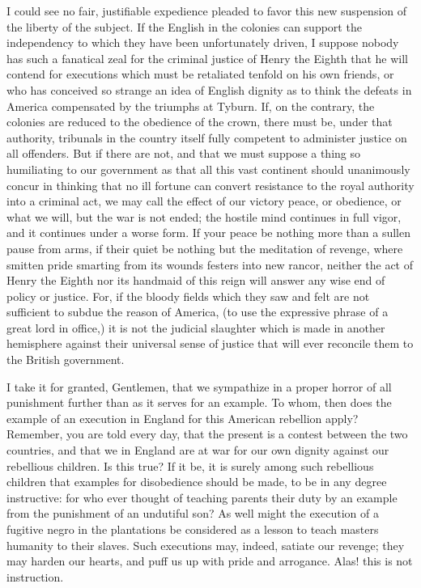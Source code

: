 I could see no fair, justifiable expedience pleaded to favor this new suspension of the liberty of the subject. If the English in the colonies can support the independency to which they have been unfortunately driven, I suppose nobody has such a fanatical zeal for the criminal justice of Henry the Eighth that he will contend for executions which must be retaliated tenfold on his own friends, or who has conceived so strange an idea of English dignity as to think the defeats in America compensated by the triumphs at Tyburn. If, on the contrary, the colonies are reduced to the obedience of the crown, there must be, under that authority, tribunals in the country itself fully competent to administer justice on all offenders. But if there are not, and that we must suppose a thing so humiliating to our government as that all this vast continent should unanimously concur in thinking that no ill fortune can convert resistance to the royal authority into a criminal act, we may call the effect of our victory peace, or obedience, or what we will, but the war is not ended; the hostile mind continues in full vigor, and it continues under a worse form. If your peace be nothing more than a sullen pause from arms, if their quiet be nothing but the meditation of revenge, where smitten pride smarting from its wounds festers into new rancor, neither the act of Henry the Eighth nor its handmaid of this reign will answer any wise end of policy or justice. For, if the bloody fields which they saw and felt are not sufficient to subdue the reason of America, (to use the expressive phrase of a great lord in office,) it is not the judicial slaughter which is made in another hemisphere against their universal sense of justice that will ever reconcile them to the British government.

I take it for granted, Gentlemen, that we sympathize in a proper horror of all punishment further than as it serves for an example. To whom, then does the example of an execution in England for this American rebellion apply? Remember, you are told every day, that the present is a contest between the two countries, and that we in England are at war for our own dignity against our rebellious children. Is this true? If it be, it is surely among such rebellious children that examples for disobedience should be made, to be in any degree instructive: for who ever thought of teaching parents their duty by an example from the punishment of an undutiful son? As well might the execution of a fugitive negro in the plantations be considered as a lesson to teach masters humanity to their slaves. Such executions may, indeed, satiate our revenge; they may harden our hearts, and puff us up with pride and arrogance. Alas! this is not instruction.

